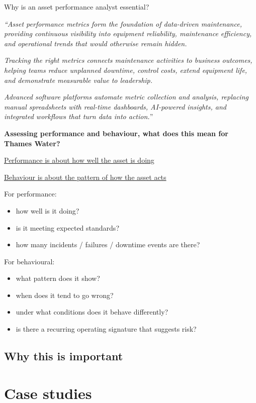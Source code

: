 \documentclass[
  letterpaper,
]{scrbook}
\begin{document}
Why is an asset performance analyst essential?

\emph{``Asset performance metrics form the foundation of data-driven
maintenance, providing continuous visibility into equipment reliability,
maintenance efficiency, and operational trends that would otherwise
remain hidden.}

\emph{Tracking the right metrics connects maintenance activities to
business outcomes, helping teams reduce unplanned downtime, control
costs, extend equipment life, and demonstrate measurable value to
leadership.}

\emph{Advanced software platforms automate metric collection and
analysis, replacing manual spreadsheets with real-time dashboards,
AI-powered insights, and integrated workflows that turn data into
action.}''

\textbf{Assessing performance and behaviour, what does this mean for
Thames Water?}

\ul{Performance is about how well the asset is doing}

\ul{Behaviour is about the pattern of how the asset acts\\
}

For performance:

\begin{itemize}
\item
  how well is it doing?
\item
  is it meeting expected standards?
\item
  how many incidents / failures / downtime events are there?
\end{itemize}

For behavioural:

\begin{itemize}
\item
  what pattern does it show?
\item
  when does it tend to go wrong?
\item
  under what conditions does it behave differently?
\item
  is there a recurring operating signature that suggests risk?
\end{itemize}

\subsection{Why this is important}\label{why-this-is-important}

\section{Case studies}\label{case-studies}
\end{document}
